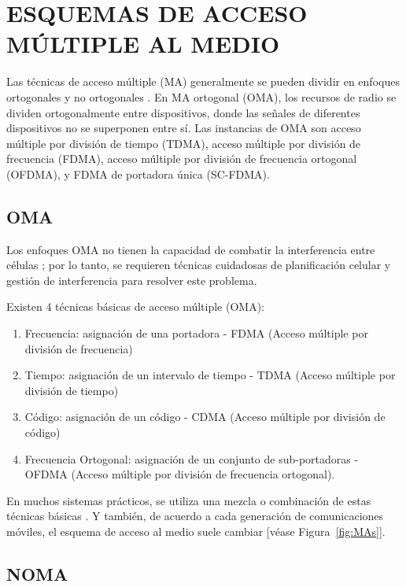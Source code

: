 \section{ESQUEMAS DE ACCESO MÚLTIPLE AL MEDIO}
Las técnicas de acceso múltiple (MA) generalmente se pueden dividir en enfoques ortogonales y no ortogonales \parencite{Tse2004}. En MA ortogonal (OMA), los recursos de radio se dividen ortogonalmente entre dispositivos, donde las señales de diferentes dispositivos no se superponen entre sí. Las instancias de OMA son acceso múltiple por división de tiempo (TDMA), acceso múltiple por división de frecuencia (FDMA), acceso múltiple por división de frecuencia ortogonal (OFDMA), y FDMA de portadora única (SC-FDMA).\newline

\subsection{OMA}

Los enfoques OMA no tienen la capacidad de combatir la interferencia entre células \parencite{Shirvanimoghaddam2017}; por lo tanto, se requieren técnicas cuidadosas de planificación celular y gestión de interferencia para resolver este problema. \newline

Existen 4 técnicas básicas de acceso múltiple (OMA):

\begin{enumerate}
\item  Frecuencia: asignación de una portadora - FDMA (Acceso múltiple por división de frecuencia)
\item  Tiempo: asignación de un intervalo de tiempo - TDMA (Acceso múltiple por división de tiempo)
\item  Código: asignación de un código - CDMA (Acceso múltiple por división de código)
\item  Frecuencia Ortogonal: asignación de un conjunto de sub-portadoras - OFDMA (Acceso múltiple por división de frecuencia ortogonal).
\end{enumerate}

En muchos sistemas prácticos, se utiliza una mezcla o combinación de estas técnicas básicas \parencite{Correia2018}. Y también, de acuerdo a cada generación de comunicaciones móviles, el esquema de acceso al medio suele cambiar [véase Figura~\ref{fig:MAs}].\newline

\subsection{NOMA}


